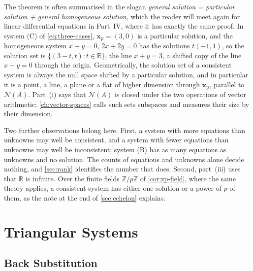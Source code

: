 The theorem is often summarised in the slogan \emph{general solution = particular solution + general homogeneous solution}, which the reader will meet again for linear differential equations in Part~IV, where it has exactly the same proof. In system (C) of \eqref{eq:three-cases}, $\mathbf x_{\mathrm p}=(3,0)$ is a particular solution, and the homogeneous system $x+y=0$, $2x+2y=0$ has the solutions $t(-1,1)$, so the solution set is $\{(3-t,t): t\in\mathbb R\}$, the line $x+y=3$, a shifted copy of the line $x+y=0$ through the origin. Geometrically, the solution set of a consistent system is always the null space shifted by a particular solution, and in particular it is a point, a line, a plane or a flat of higher dimension through $\mathbf x_{\mathrm p}$, parallel to $\mathcal N(A)$. Part~(i) says that $\mathcal N(A)$ is closed under the two operations of vector arithmetic; \cref{ch:vector-spaces} calls such sets subspaces and measures their size by their dimension.

Two further observations belong here. First, a system with more equations than unknowns may well be consistent, and a system with fewer equations than unknowns may well be inconsistent; system (B) has as many equations as unknowns and no solution. The counts of equations and unknowns alone decide nothing, and \cref{sec:rank} identifies the number that does. Second, part~(iii) uses that $\mathbb R$ is infinite. Over the finite fields $\mathbb Z/p\mathbb Z$ of \cref{cor:zp-field}, where the same theory applies, a consistent system has either one solution or a power of $p$ of them, as the note at the end of \cref{sec:echelon} explains.

\section{Triangular Systems}
\label{sec:triangular-systems}

\subsection{Back Substitution}

